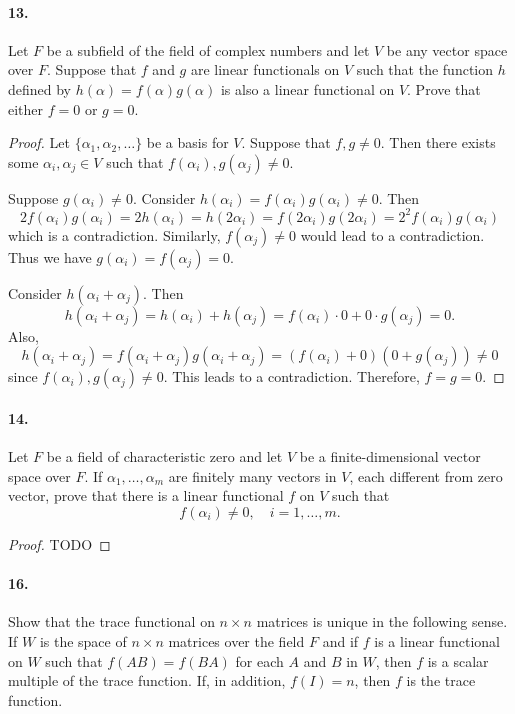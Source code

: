 \documentclass{article}
\begin{document}
\paragraph{13.} Let $F$ be a subfield of the field of complex numbers and let
$V$ be any vector space over $F$. Suppose that $f$ and $g$ are linear
functionals on $V$ such that the function $h$ defined by $h(\alpha) = f(\alpha)
g(\alpha)$ is also a linear functional on $V$. Prove that either $f = 0$ or $g =
0$.

\begin{proof}
  Let $\{\alpha_1, \alpha_2, \ldots\}$ be a basis for $V$. Suppose that $f, g
  \neq 0$. Then there exists some $\alpha_i, \alpha_j \in V$ such that
  $f(\alpha_i), g(\alpha_j) \neq 0$.

  Suppose $g(\alpha_i) \neq 0$. Consider $h(\alpha_i) = f(\alpha_i)g(\alpha_i)
  \neq 0$. Then \[
    2f(\alpha_i)g(\alpha_i) = 2h(\alpha_i) = h(2\alpha_i) =
    f(2\alpha_i)g(2\alpha_i) = 2^2f(\alpha_i)g(\alpha_i)
  \] which is a contradiction. Similarly, $f(\alpha_j) \neq 0$ would lead to a
  contradiction. Thus we have $g(\alpha_i) = f(\alpha_j) = 0$.

  Consider $h(\alpha_i + \alpha_j)$. Then \[
    h(\alpha_i + \alpha_j) = h(\alpha_i) + h(\alpha_j) = f(\alpha_i) \cdot 0 +
    0 \cdot g(\alpha_j) = 0.
  \] Also, \[
    h(\alpha_i + \alpha_j) = f(\alpha_i + \alpha_j)g(\alpha_i + \alpha_j) =
    (f(\alpha_i) + 0)(0 + g(\alpha_j)) \neq 0
  \] since $f(\alpha_i), g(\alpha_j) \neq 0$. This leads to a contradiction.
  Therefore, $f = g = 0$.
\end{proof}

\paragraph{14.} Let $F$ be a field of characteristic zero and let $V$ be a
finite-dimensional vector space over $F$. If $\alpha_1, \ldots, \alpha_m$ are
finitely many vectors in $V$, each different from zero vector, prove that there
is a linear functional $f$ on $V$ such that \[
  f(\alpha_i) \neq 0,\quad
  i = 1, \ldots, m.
\]

\begin{proof}
  TODO
\end{proof}

\paragraph{16.} Show that the trace functional on $n \times n$ matrices is
unique in the following sense. If $W$ is the space of $n \times n$ matrices over
the field $F$ and if $f$ is a linear functional on $W$ such that $f(AB) = f(BA)$
for each $A$ and $B$ in $W$, then $f$ is a scalar multiple of the trace
function. If, in addition, $f(I) = n$, then $f$ is the trace function.
\end{document}
